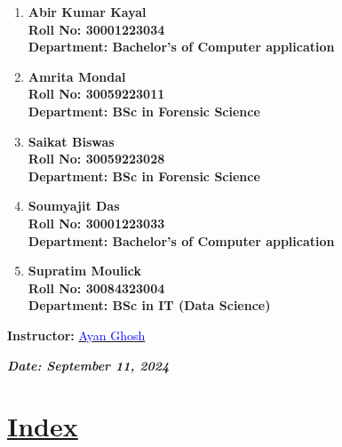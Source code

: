 \documentclass[a4paper,12pt]{article}
\begin{document}
\begin{titlepage}
    \normalsize
    \begin{enumerate}
        \item \textbf{Abir Kumar Kayal}\\
              \textbf{Roll No: 30001223034}\\
              \textbf{Department: Bachelor's of Computer application}
        \item \textbf{Amrita Mondal}\\
              \textbf{Roll No: 30059223011}\\
              \textbf{Department: BSc in Forensic Science}
        \item \textbf{Saikat Biswas}\\
              \textbf{Roll No: 30059223028}\\
              \textbf{Department: BSc in Forensic Science}
        \item \textbf{Soumyajit Das}\\
              \textbf{Roll No: 30001223033}\\
              \textbf{Department: Bachelor's of Computer application}
        \item \textbf{Supratim Moulick}\\
              \textbf{Roll No: 30084323004}\\
              \textbf{Department: BSc in IT (Data Science)}
    \end{enumerate}
    \vspace{0.8 cm}
    
    \textbf{Instructor:} \href{mailto:ayan.ghosh@university.edu}{\textcolor{blue}{Ayan Ghosh}}\\
    \vspace{0.2cm}
    
    \textbf{\textit{Date: September 11, 2024}}

\end{titlepage}
\newpage
{}
\vspace{-2cm}

\centering
\section*{\underline{\Huge\textbf{\textcolor{blue!60}{Index}}}}
\vspace{0.5cm}
\end{document}
